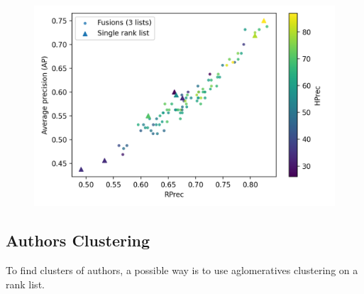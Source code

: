 \begin{figure}
  \includegraphics[width=\linewidth]{img/fusion_oxquarry.png}
  \caption{}
  \label{fig:fusion_oxquarry}
\end{figure}


\subsection{Authors Clustering}

To find clusters of authors, a possible way is to use aglomeratives clustering on a rank list.
